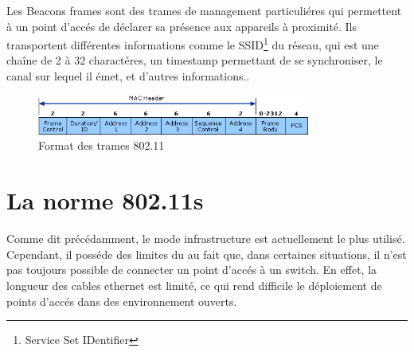 Les Beacons frames sont des trames de management particuliéres qui permettent à un point d'accés de déclarer sa présence aux
appareils à proximité. Ils transportent différentes informations comme le SSID\footnote{Service Set IDentifier} du réseau,
qui est une chaîne de 2 à 32 charactéres, un timestamp permettant de se synchroniser, le canal sur lequel il émet, 
et d'autres informations.\cite{WFfunc2}.
\begin{figure}
   \centering
   \includegraphics[width=0.8\textwidth,natwidth=488,natheight=513]{images/header_wifi.png}
   \caption{Format des trames 802.11}
\end{figure}

\section{La norme 802.11s}
Comme dit précédamment, le mode infrastructure est actuellement le plus utilisé. Cependant, il posséde des limites du au fait
que, dans certaines situations, il n'est pas toujours possible de connecter un point d'accés à un switch\cite{MNintro}.
En effet, la longueur des cables ethernet est limité, ce qui rend difficile le déploiement de points d'accés dans des
environnement ouverts.

